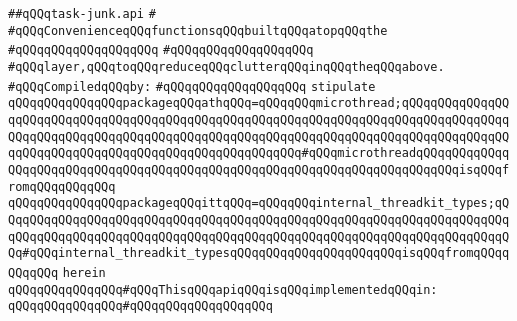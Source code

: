 \label{src/lib/src/lib/thread-kit/src/core-thread-kit/task-junk.api}
\verb|##qQQqtask-junk.api|\newline
\verb|#|\newline
\verb|#qQQqConvenienceqQQqfunctionsqQQqbuiltqQQqatopqQQqthe|\newline
\verb|#qQQqqQQqqQQqqQQqqQQq|\newline
\verb|#qQQqqQQqqQQqqQQqqQQq|\newline
\verb|#qQQqlayer,qQQqtoqQQqreduceqQQqclutterqQQqinqQQqtheqQQqabove.|\newline
\newline
\verb|#qQQqCompiledqQQqby:|\newline
\verb|#qQQqqQQqqQQqqQQqqQQq|\newline
\newline
\verb|stipulate|\newline
\verb|qQQqqQQqqQQqqQQqpackageqQQqathqQQq=qQQqqQQqmicrothread;qQQqqQQqqQQqqQQqqQQqqQQqqQQqqQQqqQQqqQQqqQQqqQQqqQQqqQQqqQQqqQQqqQQqqQQqqQQqqQQqqQQqqQQqqQQqqQQqqQQqqQQqqQQqqQQqqQQqqQQqqQQqqQQqqQQqqQQqqQQqqQQqqQQqqQQqqQQqqQQqqQQqqQQqqQQqqQQqqQQqqQQqqQQqqQQqqQQq#qQQqmicrothreadqQQqqQQqqQQqqQQqqQQqqQQqqQQqqQQqqQQqqQQqqQQqqQQqqQQqqQQqqQQqqQQqqQQqqQQqqQQqisqQQqfromqQQqqQQqqQQq|\newline
\verb|qQQqqQQqqQQqqQQqpackageqQQqittqQQq=qQQqqQQqinternal_threadkit_types;qQQqqQQqqQQqqQQqqQQqqQQqqQQqqQQqqQQqqQQqqQQqqQQqqQQqqQQqqQQqqQQqqQQqqQQqqQQqqQQqqQQqqQQqqQQqqQQqqQQqqQQqqQQqqQQqqQQqqQQqqQQqqQQqqQQqqQQqqQQqqQQq#qQQqinternal_threadkit_typesqQQqqQQqqQQqqQQqqQQqqQQqisqQQqfromqQQqqQQqqQQq|\newline
\verb|herein|\newline
\newline
\verb|qQQqqQQqqQQqqQQq#qQQqThisqQQqapiqQQqisqQQqimplementedqQQqin:|\newline
\verb|qQQqqQQqqQQqqQQq#qQQqqQQqqQQqqQQqqQQq|\newline
